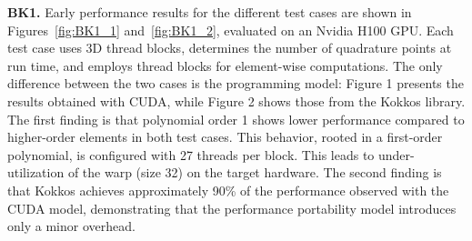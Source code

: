 \documentclass[a4paper,12pt]{article}
\begin{document}
{\bf BK1.} Early performance results for the different test cases are shown in Figures~\ref{fig:BK1_1} and~\ref{fig:BK1_2}, evaluated on an Nvidia H100 GPU. Each test case uses 3D thread blocks, determines the number of quadrature points at run time, and employs thread blocks for element-wise computations. The only difference between the two cases is the programming model: Figure 1 presents the results obtained with CUDA, while Figure 2 shows those from the Kokkos library.
The first finding is that polynomial order 1 shows lower performance compared to higher-order elements in both test cases. This behavior, rooted in a first-order polynomial, is configured with 27 threads per block. This leads to under-utilization of the warp (size 32) on the target hardware.
The second finding is that Kokkos achieves approximately 90\% of the performance observed with the CUDA model, demonstrating that the performance portability model introduces only a minor overhead.
\end{document}
